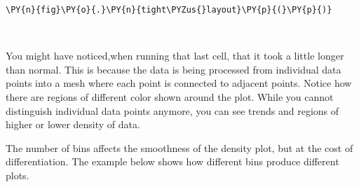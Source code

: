 \begin{tcolorbox}[breakable, size=fbox, boxrule=1pt, pad at break*=1mm,colback=cellbackground, colframe=cellborder]
\begin{Verbatim}[commandchars=\\\{\}]
\PY{n}{fig}\PY{o}{.}\PY{n}{tight\PYZus{}layout}\PY{p}{(}\PY{p}{)}
\end{Verbatim}
\end{tcolorbox}

    \begin{center}
    \end{center}
    { \hspace*{\fill} \\}
    
    You might have noticed,when running that last cell, that it took a
little longer than normal. This is because the data is being processed
from individual data points into a mesh where each point is connected to
adjacent points. Notice how there are regions of different color shown
around the plot. While you cannot distinguish individual data points
anymore, you can see trends and regions of higher or lower density of
data.

The number of bins affects the smoothness of the density plot, but at
the cost of differentiation. The example below shows how different bins
produce different plots.

